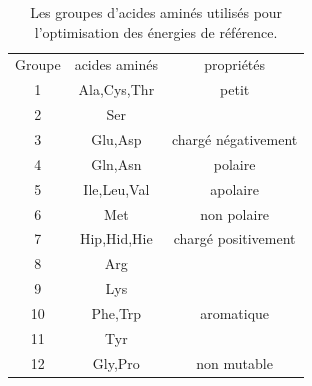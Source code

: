     \begin{table}[!htbp]
      \centering

      \begin{tabular}{ccc}

        \toprule
        Groupe & acides aminés & propriétés\\
        \cmidrule{1-3}

        1   & Ala,Cys,Thr & petit\\
        2   & Ser &\\
        \cmidrule{1-3}
        3   & Glu,Asp & chargé négativement\\
        \cmidrule{1-3}
        4   & Gln,Asn & polaire\\
        \cmidrule{1-3}
        5   & Ile,Leu,Val & apolaire\\
        \cmidrule{1-3}
        6   & Met & non polaire\\
        \cmidrule{1-3}
        7   & Hip,Hid,Hie & chargé positivement\\
        8   & Arg \\
        9   & Lys \\
        \cmidrule{1-3}
        10  & Phe,Trp & aromatique\\
        11  & Tyr \\
        \cmidrule{1-3}
        12  & Gly,Pro & non mutable\\
        \bottomrule


      \end{tabular}      
      \caption{Les groupes d'acides aminés utilisés pour l'optimisation des énergies de référence.}
\label{tab:AA_groupes}      
    \end{table}



